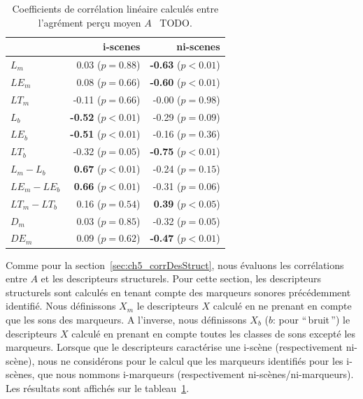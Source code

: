 \begin{table}[t]
\centering
\begin{tabular}{l r r} 
               &   i-scenes                   & ni-scenes \\
\hline
$L_m$            & 0.03  ($p=0.88$)           & \textbf{-0.63} ($p<0.01$) \\
$LE_m$           & 0.08  ($p=0.66$)           & \textbf{-0.60} ($p<0.01$) \\
$LT_m$           & -0.11 ($p=0.66$)           & -0.00 ($p=0.98$) \\
$L_b$            & \textbf{-0.52} ($p<0.01$)  & -0.29 ($p=0.09$) \\
$LE_b$           & \textbf{-0.51} ($p<0.01$)  & -0.16 ($p=0.36$) \\
$LT_b$           & -0.32 ($p=0.05$)           & \textbf{-0.75} ($p<0.01$) \\
$L_m-L_b$        & \textbf{0.67} ($p<0.01$)   & -0.24 ($p=0.15$) \\
$LE_m-LE_b$      & \textbf{0.66} ($p<0.01$)   & -0.31 ($p=0.06$) \\
$LT_m-LT_b$      & 0.16 ($p=0.54$)            & \textbf{0.39} ($p<0.05$) \\
$D_m$            & 0.03 ($p=0.85$)            & -0.32 ($p=0.05$) \\
$DE_m$           & 0.09  ($p=0.62$)           & \textbf{-0.47} ($p<0.01$) \\
\hline
\end{tabular}
\vspace{0.5mm}
\caption{Coefficients de corrélation linéaire calculés entre l'agrément perçu moyen $A$ \vs~TODO.}
\label{tab:corrMarkers}
\end{table}

Comme pour la  section~\ref{sec:ch5_corrDesStruct}, nous évaluons les corrélations entre $A$ et les descripteurs structurels. Pour cette section, les descripteurs structurels sont calculés en tenant compte des marqueurs sonores précédemment identifié. Nous définissons $X_m$ le descripteurs $X$ calculé en ne prenant en compte que les sons des marqueurs. A l'inverse, nous définissons $X_b$ ($b$: pour ``\,bruit\,'') le descripteurs $X$ calculé en prenant en compte toutes les classes de sons excepté les marqueurs. Lorsque que le descripteurs caractérise une i-scène (respectivement ni-scène), nous ne considérons pour le calcul que les marqueurs identifiés pour les i-scènes, que nous nommons i-marqueurs (respectivement ni-scènes/ni-marqueurs). Les résultats sont affichés sur le tableau~\ref{tab:corrMarkers}.

